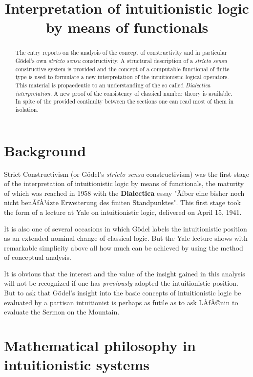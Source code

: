 \documentclass[12pt]{article}
\begin{document}
\title{Interpretation of intuitionistic logic by  means of functionals}\Large 
\maketitle

\begin{abstract}
The entry reports on the analysis of the concept of constructivity and in particular G\"{o}del's own \emph{stricto sensu} constructivity. A structural description of a \emph{stricto sensu} constructive system is provided and the concept of a computable functional of finite type is used to formulate a new interpretation of the intuitionistic logical operators. This material is propaedeutic to an understanding of the so called \emph{Dialectica interpretation}. A new proof of the consistency of classical number theory is available. In spite of the provided continuity between the sections one can read most of them in isolation.
\end{abstract}

\tableofcontents

\section{Background}\normalsize

Strict Constructivism (or G\"{o}del's \emph{stricto sensu} constructivism) was the first stage of the interpretation of intuitionistic logic by means of functionals, the maturity of which was reached in 1958 with the \textbf{Dialectica} essay "Ãƒber eine bisher noch nicht benÃƒÂ¼zte Erweiterung des finiten Standpunktes". This first stage took the form of a lecture at Yale on intuitionistic logic, delivered on April 15, 1941.

It is also one of several occasions in which G\"{o}del labels the intuitionistic position as an extended nominal change of classical logic. But the Yale lecture shows with remarkable simplicity above all how much can be achieved by using the method of conceptual analysis.

It is obvious that the interest and the value of the insight gained in this analysis will not be recognized if one has \emph{previously} adopted the intuitionistic position. But to ask that G\"{o}del's insight into the basic concepts of intuitionistic logic be evaluated by a partisan intuitionist is perhaps as futile as to ask LÃƒÂ©nin to evaluate the Sermon on the Mountain.

\section{Mathematical philosophy in intuitionistic systems}\normalsize
\end{document}
